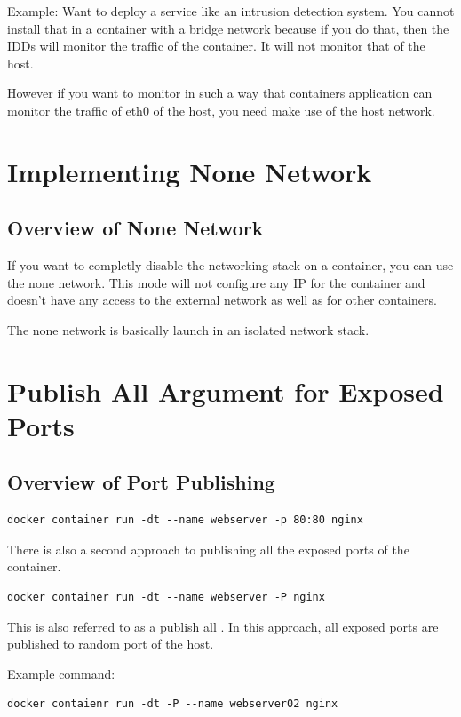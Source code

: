 \documentclass[11pt]{book}
\begin{document}
    Example:
    Want to deploy a service like an intrusion detection system.
    You cannot install that in a container with a bridge network because if you do that, then the IDDs will monitor the traffic of the container.
    It will not monitor that of the host.

    However if you want to monitor in such a way that containers application can monitor the traffic of eth0 of the host, you need make use of the host network.

    \section{Implementing None Network}
    \subsection{Overview of None Network}
    If you want to completly disable the networking stack on a container, you can use the none network.
    This mode will not configure any IP for the container and doesn't have any access to the external network as well as for other containers.

    The none network is basically launch in an isolated network stack.

    \section{Publish All Argument for Exposed Ports}
    \subsection{Overview of Port Publishing}
    \begin{lstlisting}[style=terminal]
        docker container run -dt --name webserver -p 80:80 nginx
    \end{lstlisting}

    There is also a second approach to publishing all the exposed ports of the container.
    \begin{lstlisting}[style=terminal]
        docker container run -dt --name webserver -P nginx
    \end{lstlisting}

    This is also referred to as a publish all .
    In this approach, all exposed ports are published to random port of the host.

    Example command:
    \begin{lstlisting}[style=terminal]
        docker contaienr run -dt -P --name webserver02 nginx
    \end{lstlisting}
\end{document}
